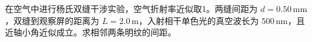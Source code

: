在空气中进行杨氏双缝干涉实验，空气折射率近似取1。两缝间距为 $d=0.50\,\mathrm{mm}$，双缝到观察屏的距离为 $L=2.0\,\mathrm m$，入射相干单色光的真空波长为 $500\,\mathrm{nm}$，且近轴小角近似成立。求相邻两条明纹的间距。
